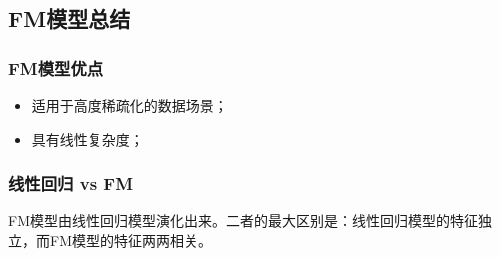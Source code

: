\documentclass[12pt]{article}
\begin{document}
\subsection{FM模型总结}
\subsubsection{FM模型优点}
\begin{itemize}
\setlength{\itemsep}{0pt}
\setlength{\parsep}{0pt}
\setlength{\parskip}{0pt}
    \item 适用于高度稀疏化的数据场景；
    \item 具有线性复杂度；
\end{itemize}

\subsubsection{线性回归 vs FM}
FM模型由线性回归模型演化出来。二者的最大区别是：线性回归模型的特征独立，而FM模型的特征两两相关。




\end{document}
